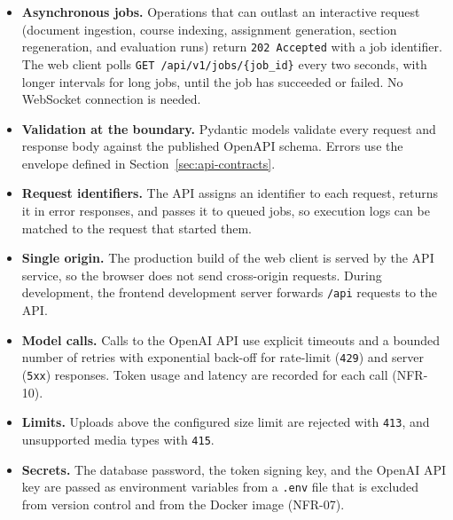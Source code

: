 \documentclass[12pt,a4paper]{article}
\begin{document}
\begin{itemize}
    \item \textbf{Asynchronous jobs.} Operations that can outlast an
    interactive request (document ingestion, course indexing,
    assignment generation, section regeneration, and evaluation runs)
    return \texttt{202 Accepted} with a job identifier. The web client
    polls \texttt{GET /api/v1/jobs/\{job\_id\}} every two seconds,
    with longer intervals for long jobs, until the job has succeeded
    or failed. No WebSocket connection is needed.

    \item \textbf{Validation at the boundary.} Pydantic models validate
    every request and response body against the published OpenAPI
    schema. Errors use the envelope defined in
    Section~\ref{sec:api-contracts}.

    \item \textbf{Request identifiers.} The API assigns an identifier to
    each request, returns it in error responses, and passes it to
    queued jobs, so execution logs can be matched to the request that
    started them.

    \item \textbf{Single origin.} The production build of the web client
    is served by the API service, so the browser does not send
    cross-origin requests. During development, the frontend
    development server forwards \texttt{/api} requests to the API.

    \item \textbf{Model calls.} Calls to the OpenAI API use explicit
    timeouts and a bounded number of retries with exponential back-off
    for rate-limit (\texttt{429}) and server (\texttt{5xx}) responses.
    Token usage and latency are recorded for each call (NFR-10).

    \item \textbf{Limits.} Uploads above the configured size limit are
    rejected with \texttt{413}, and unsupported media types with
    \texttt{415}.

    \item \textbf{Secrets.} The database password, the token signing
    key, and the OpenAI API key are passed as environment variables
    from a \texttt{.env} file that is excluded from version control
    and from the Docker image (NFR-07).
\end{itemize}

\end{document}
